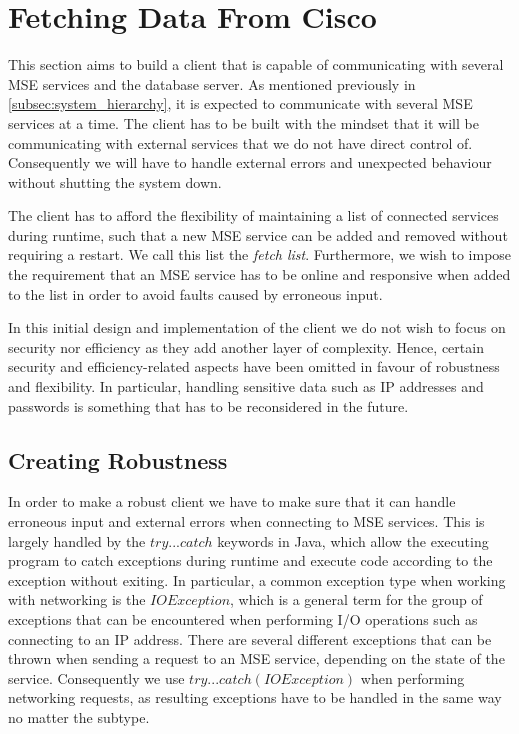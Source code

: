\section{Fetching Data From Cisco} \label{sec:fetch_data}
This section aims to build a client that is capable of communicating with several MSE services and the database server. As mentioned previously in \cref{subsec:system_hierarchy}, it is expected to communicate with several MSE services at a time. The client has to be built with the mindset that it will be communicating with external services that we do not have direct control of. Consequently we will have to handle external errors and unexpected behaviour without shutting the system down. 

The client has to afford the flexibility of maintaining a list of connected services during runtime, such that a new MSE service can be added and removed without requiring a restart. We call this list the \emph{fetch list}. Furthermore, we wish to impose the requirement that an MSE service has to be online and responsive when added to the list in order to avoid faults caused by erroneous input.

In this initial design and implementation of the client we do not wish to focus on security nor efficiency as they add another layer of complexity. Hence, certain security and efficiency-related aspects have been omitted in favour of robustness and flexibility. In particular, handling sensitive data such as IP addresses and passwords is something that has to be reconsidered in the future. %

\subsection{Creating Robustness}
In order to make a robust client we have to make sure that it can handle erroneous input and external errors when connecting to MSE services. This is largely handled by the $try...catch$ keywords in Java, which allow the executing program to catch exceptions during runtime and execute code according to the exception without exiting. In particular, a common exception type when working with networking is the $IOException$, which is a general term for the group of exceptions that can be encountered when performing I/O operations such as connecting to an IP address. There are several different exceptions that can be thrown when sending a request to an MSE service, depending on the state of the service. Consequently we use $try... catch(IOException)$ when performing networking requests, as resulting exceptions have to be handled in the same way no matter the subtype.

